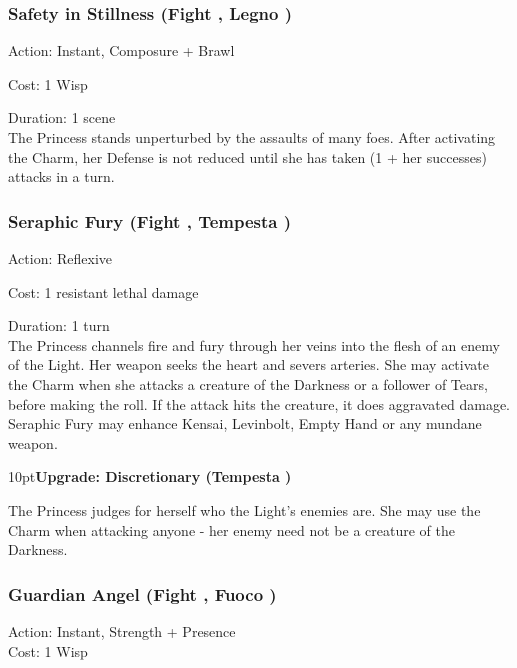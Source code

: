 \subsubsection*{Safety in Stillness (Fight \textbullet\textbullet, Legno \textbullet)}

\noindent Action: Instant, Composure + Brawl

\noindent Cost: 1 Wisp

\noindent Duration: 1 scene\\

\noindent The Princess stands unperturbed by the assaults of many foes. After activating the Charm, her Defense is not reduced until she has taken (1 + her successes) attacks in a turn.

\subsubsection*{Seraphic Fury (Fight \textbullet\textbullet, Tempesta \textbullet\textbullet)}

\noindent Action: Reflexive

\noindent Cost: 1 resistant lethal damage

\noindent Duration: 1 turn\\

The Princess channels fire and fury through her veins into the flesh of an enemy of the Light. Her weapon seeks the heart and severs arteries. She may activate the Charm when she attacks a creature of the Darkness or a follower of Tears, before making the roll. If the attack hits the creature, it does aggravated damage. Seraphic Fury may enhance Kensai, Levinbolt, Empty Hand or any mundane weapon.

\begin{myindentpar}{10pt}\textbf{Upgrade: Discretionary (Tempesta \textbullet\textbullet\textbullet\textbullet)}

The Princess judges for herself who the Light’s enemies are. She may use the Charm when attacking anyone - her enemy need not be a creature of the Darkness.\end{myindentpar}

\subsubsection*{Guardian Angel (Fight \textbullet\textbullet, Fuoco \textbullet)}
\noindent Action: Instant, Strength + Presence\\

\noindent Cost: 1 Wisp\\


